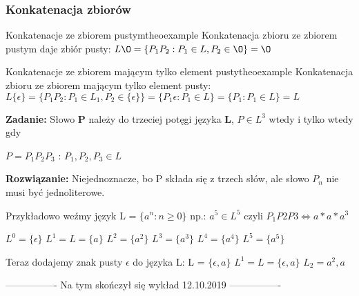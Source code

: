 	
	\subsubsection{Konkatenacja zbiorów}
		\begin{mytheo}{Konkatenacje ze zbiorem pustym}{theoexample}
			Konkatenacja zbioru ze zbiorem pustym daje zbiór pusty: \newline
			$L\O = \{ P_{1}P_{2} : P_{1} \in L, P_{2} \in \O \} = \O$
		\end{mytheo}
		
		\begin{mytheo}{Konkatenacje ze zbiorem mającym tylko element pusty}{theoexample}
			Konkatenacja zbioru ze zbiorem mającym tylko element pusty: \newline
			$L \{ \epsilon \} = \{ P_{1}P_{2}: P_{1} \in L_{1}, P_{2} \in \{ \epsilon \} \} = 
			\{ P_{1}\epsilon : P_{1} \in L \} = \{ P_{1} : P_{1} \in L \} = L$
		\end{mytheo}
		

		\begin{tcolorbox}
			\textbf{Zadanie:} \newline
			Słowo  \textbf{P} należy do trzeciej potęgi języka \textbf{L}, $P \in L^{3}$ 
			wtedy i tylko wtedy gdy 
			
				\begin{center}
					$P=P_{1}P_{2}P_{3}$ :  $P_{1},P_{2},P_{3} \in L$
				\end{center}
						
			\textbf{Rozwiązanie:} \newline
			Niejednoznacze, bo P składa się z trzech słów, ale słowo $P_{n}$ 
			nie musi być jednoliterowe. \newline
			
			Przykładowo weźmy język L = $\{ a^{n} : n \ge 0\}$ \newline
			np.: $a^{5} \in L^{5}$ czyli $P_{1}P{2}P{3} \Leftrightarrow a*a*a^{3}$ \newline \newline
			
			$L^{0} = \{ \epsilon \}$ \newline
			$L^{1} = L = \{ a \}$ \newline
			$L^{2} = \{ a^{2} \}$ \newline
			$L^{3} = \{ a^{3} \}$ \newline
			$L^{4} = \{ a^{4} \}$ \newline
			$L^{5} = \{ a^{5} \}$ \newline \newline
			
			Teraz dodajemy znak pusty $\epsilon$ do języka L: \newline
			L = $\{\epsilon, a\}$ \newline
			$L^{1} = L = \{ \epsilon, a \}$ \newline
			$L_{2} = {a^{2}, a}$ \newline
			
			\begin{center}
				---------------- Na tym skończył się wykład 12.10.2019 ----------------
			\end{center}
		
		\end{tcolorbox}